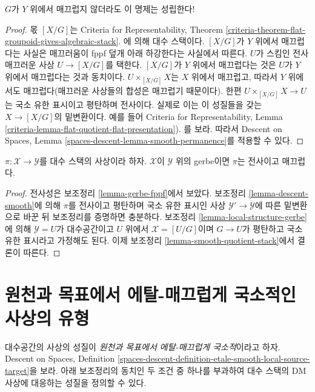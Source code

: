 \noindent
$G$가 $Y$ 위에서 매끄럽지 않더라도 이 명제는 성립한다!

\begin{proof}
몫 $[X/G]$는 Criteria for Representability, Theorem
\ref{criteria-theorem-flat-groupoid-gives-algebraic-stack}.
에 의해 대수 스택이다. $[X/G]$가 $Y$ 위에서 매끄럽다는 사실은 매끄러움이
fppf 덮개 아래 하강한다는 사실에서 따른다. $U$가 스킴인 전사 매끄러운
사상 $U \to [X/G]$를 택한다. $[X/G]$가 $Y$ 위에서 매끄럽다는 것은
$U$가 $Y$ 위에서 매끄럽다는 것과 동치이다.
$U \times_{[X/G]} X$는 $X$ 위에서 매끄럽고, 따라서 $Y$ 위에서도
매끄럽다(매끄러운 사상들의 합성은 매끄럽기 때문이다). 한편
$U \times_{[X/G]} X \to U$는 국소 유한 표시이고 평탄하며 전사이다.
실제로 이는 이 성질들을 갖는 $X \to [X/G]$의 밑변환이다. 예를 들어
Criteria for Representability, Lemma
\ref{criteria-lemma-flat-quotient-flat-presentation}).
를 보라. 따라서 Descent on Spaces, Lemma
\ref{spaces-descent-lemma-smooth-permanence}를 적용할 수 있다.
\end{proof}

\begin{lemma}
\label{lemma-gerbe-smooth}
$\pi : \mathcal{X} \to \mathcal{Y}$를 대수 스택의 사상이라 하자.
$\mathcal{X}$이 $\mathcal{Y}$ 위의 gerbe이면 $\pi$는 전사이고 매끄럽다.
\end{lemma}

\begin{proof}
전사성은 보조정리 \ref{lemma-gerbe-fppf}에서 보았다. 보조정리
\ref{lemma-descent-smooth}에 의해 $\pi$를 전사이고 평탄하며 국소 유한
표시인 사상 $\mathcal{Y}' \to \mathcal{Y}$에 따른 밑변환으로 바꾼 뒤
보조정리를 증명하면 충분하다.%
보조정리 \ref{lemma-local-structure-gerbe}에 의해 $\mathcal{Y} = U$가
대수공간이고 $U$ 위에서 $\mathcal{X} = [U/G]$이며 $G \to U$가 평탄하고
국소 유한 표시라고 가정해도 된다. 이제 보조정리
\ref{lemma-smooth-quotient-stack}에서 결론이 따른다.
\end{proof}






\section{원천과 목표에서 에탈-매끄럽게 국소적인 사상의 유형}
\label{section-etale-smooth-local-source-target}

\noindent
대수공간의 사상의 성질이 {\it 원천과 목표에서 에탈-매끄럽게 국소적}이라고
하자. Descent on Spaces, Definition
\ref{spaces-descent-definition-etale-smooth-local-source-target}을 보라. 아래
보조정리의 동치인 두 조건 중 하나를 부과하여 대수 스택의 DM 사상에
대응하는 성질을 정의할 수 있다.

